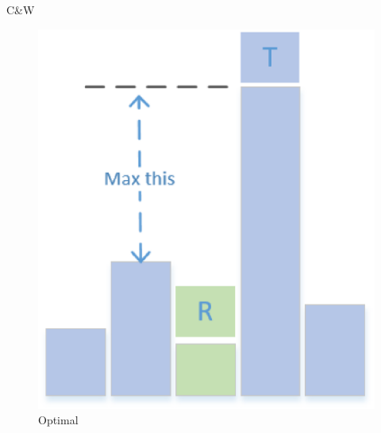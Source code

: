 \documentclass[
 size=12pt,
 paper=smartboard, %
 mode=present, %
 display=slides, %
style=tuliplab,
pauseslide,
fleqn,leqno]{powerdot}
\begin{document}
\begin{slide}{C\&W\cite{RN139}}
\begin{itemize}
\begin{figure}[h]
      \pause
      \begin{minipage}[t]{0.25\linewidth}
        \centering
        \includegraphics[width=1.0\textwidth]{figures3/optimal.eps}
        \caption{Optimal}
        \label{fig:optimal-solution}
      \end{minipage}
    \end{figure}
  \end{itemize}
\end{slide}
\end{document}
